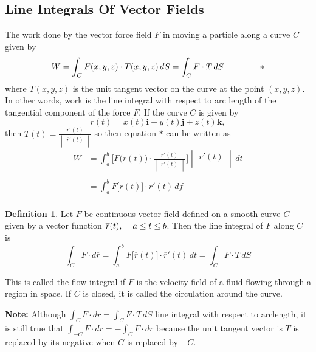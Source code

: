 \documentclass[11pt,a4paper]{article}
\theoremstyle{definition}
\newtheorem{defn}[thm]{Definition}
\begin{document}
{\color[wave]{485}\subsection{Line Integrals Of Vector Fields}}
The work done by the vector force field $F$ in moving a particle along a curve $C$ given by
$$W = \int_C F(x,y,z)\cdot T(x,y,z)\,dS = \int_C F\cdot T\,dS\hspace{1.5cm}*$$
where $T(x,y,z)$ is the unit tangent vector on the curve at the point $(x,y,z)$. In other words, work is the line integral with respect to arc length of the tangential component of the force $F$. If the curve $C$ is given by $$\overline{r}(t) = x(t)\textbf{i} + y(t)\textbf{j} + z(t)\textbf{k},$$ then $\displaystyle{T(t) = \frac{\overline{r}'(t)}{
\begin{vmatrix}
\overline{r}'(t)\\
\end{vmatrix}
}}$ so then equation $*$ can be written as 
\begin{align*}
W & = \int^b_a \Bigg[F\big(\overline{r}(t)\big) \cdot \frac{\overline{r}'(t)}{\begin{vmatrix}
\overline{r}'(t)\\
\end{vmatrix}
}\Bigg]\begin{vmatrix}
\overline{r}'(t)\\
\end{vmatrix}\,dt\\\\
& = \int^b_aF\big[\overline{r}(t)\big]\cdot \overline{r}'(t)\,df\\
\end{align*}

\begin{defn}


Let $F$ be continuous vector field defined on a smooth curve $C$  given by a vector function $\overline{r}(t),\hspace{0.4cm} a\leq t \leq b$. Then the line integral of $F$ along $C$ is $$\int_C F\cdot d \overline{r} = \int^b_a F\big[\overline{r}(t)\big]\cdot \overline{r}'(t)\, dt = \int_C F\cdot T\,dS$$

This is called the flow integral if $F$ is the velocity field of a fluid flowing through a region in space. If $C$ is closed, it is called the circulation around the curve.


\textbf{Note:} Although $\displaystyle{\int_C F\cdot d \overline{r} = \int_C F\cdot T\, dS}$ line integral with respect to arclength, it is still true that $\displaystyle{\int_{-C}F\cdot d\overline{r} = -\int_C F\cdot d\overline{r}}$ because the unit tangent vector is $T$ is replaced by its negative when $C$ is replaced by $-C$.
\end{defn}
\end{document}
